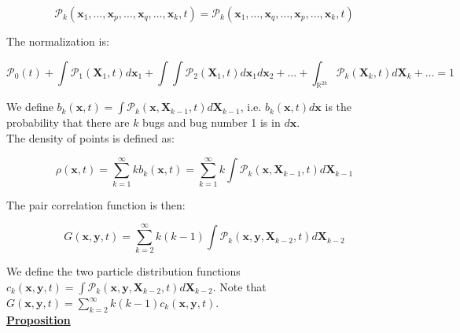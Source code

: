 \begin{equation}
\mathcal{P}_{k}(\boldsymbol{x}_{1},\ldots,\boldsymbol{x}_{p},\ldots,\boldsymbol{x}_{q},\ldots,\boldsymbol{x}_{k},t)=\mathcal{P}_{k}(\boldsymbol{x}_{1},\ldots,\boldsymbol{x}_{q},\ldots,\boldsymbol{x}_{p},\ldots,\boldsymbol{x}_{k},t)
\end{equation}

\vspace{1.25em}

The normalization is: 

\begin{equation}
\mathcal{P}_{0}(t)+\int\mathcal{P}_{1}(\boldsymbol{X}_{1},t)d\boldsymbol{x}_{1}+\int\int\mathcal{P}_{2}(\boldsymbol{X}_{1},t)d\boldsymbol{x}_{1}d\boldsymbol{x}_{2}+\ldots+\int_{\mathbb{R}^{2k}}\mathcal{P}_{k}(\boldsymbol{X}_{k},t)d\boldsymbol{X}_{k}+\ldots=1
\end{equation}

\vspace{1.25em}

We define $b_{k}(\boldsymbol{x},t)=\int\mathcal{P}_{k}(\boldsymbol{x},\boldsymbol{X}_{k-1},t)d\boldsymbol{X}_{k-1}$, i.e. $b_{k}(\boldsymbol{x},t)d\boldsymbol{x}$ is 
the probability that there are $k$ bugs and bug number 1 is in $d\boldsymbol{x}$.\\

The density of points is defined as:

\begin{equation}
\rho(\boldsymbol{x},t)=\sum_{k=1}^{\infty}kb_{k}(\boldsymbol{x},t)=\sum_{k=1}^{\infty}k\int\mathcal{P}_{k}(\boldsymbol{x},\boldsymbol{X}_{k-1},t)d\boldsymbol{X}_{k-1}
\end{equation}

The pair correlation function is then:

\begin{equation}
G(\boldsymbol{x},\boldsymbol{y},t)=\sum_{k=2}^{\infty}k(k-1)\int\mathcal{P}_{k}(\boldsymbol{x},\boldsymbol{y},\boldsymbol{X}_{k-2},t)d\boldsymbol{X}_{k-2} \label{eq:def_pairdens}
\end{equation}

We define the two particle distribution functions $c_{k}(\boldsymbol{x},\boldsymbol{y},t)=\int\mathcal{P}_{k}(\boldsymbol{x},\boldsymbol{y},\boldsymbol{X}_{k-2},t)d\boldsymbol{X}_{k-2}$. Note that $G(\boldsymbol{x},\boldsymbol{y},t)=\sum_{k=2}^{\infty}k(k-1)c_{k}(\boldsymbol{x},\boldsymbol{y},t)$.\\

\textbf{\underline{Proposition}}\\

